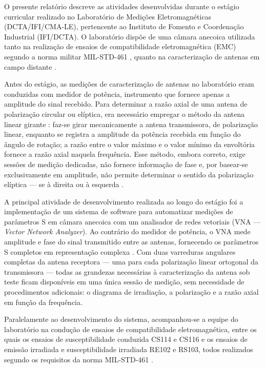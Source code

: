 \documentclass[12pt, a4paper]{article}
\begin{document}
O presente relatório descreve as atividades desenvolvidas durante o estágio curricular realizado no Laboratório de Medições Eletromagnéticas (DCTA/IFI/CMA-LE), pertencente ao Instituto de Fomento e Coordenação Industrial (IFI/DCTA). O laboratório dispõe de uma câmara anecoica utilizada tanto na realização de ensaios de compatibilidade eletromagnética (EMC) segundo a norma militar MIL-STD-461 \citep{milstd461}, quanto na caracterização de antenas em campo distante \citep{oliveira2020}.

Antes do estágio, as medições de caracterização de antenas no laboratório eram conduzidas com medidor de potência, instrumento que fornece apenas a amplitude do sinal recebido. Para determinar a razão axial de uma antena de polarização circular ou elíptica, era necessário empregar o método da antena linear girante \citep{ieee149_2021}: faz-se girar mecanicamente a antena transmissora, de polarização linear, enquanto se registra a amplitude da potência recebida em função do ângulo de rotação; a razão entre o valor máximo e o valor mínimo da envoltória fornece a razão axial naquela frequência. Esse método, embora correto, exige sessões de medição dedicadas, não fornece informação de fase e, por basear-se exclusivamente em amplitude, não permite determinar o sentido da polarização elíptica --- se à direita ou à esquerda \citep{ieee149_2021}.

A principal atividade de desenvolvimento realizada ao longo do estágio foi a implementação de um sistema de software para automatizar medições de parâmetros S em câmara anecoica com um analisador de redes vetoriais (VNA --- \textit{Vector Network Analyzer}). Ao contrário do medidor de potência, o VNA mede amplitude e fase do sinal transmitido entre as antenas, fornecendo os parâmetros S completos em representação complexa \citep{ieee149_2021}. Com duas varreduras angulares completas da antena receptora --- uma para cada polarização linear ortogonal da transmissora --- todas as grandezas necessárias à caracterização da antena sob teste ficam disponíveis em uma única sessão de medição, sem necessidade de procedimentos adicionais: o diagrama de irradiação, a polarização e a razão axial em função da frequência.

Paralelamente ao desenvolvimento do sistema, acompanhou-se a equipe do laboratório na condução de ensaios de compatibilidade eletromagnética, entre os quais os ensaios de susceptibilidade conduzida CS114 e CS116 e os ensaios de emissão irradiada e susceptibilidade irradiada RE102 e RS103, todos realizados segundo os requisitos da norma MIL-STD-461 \citep{milstd461}.
\end{document}
